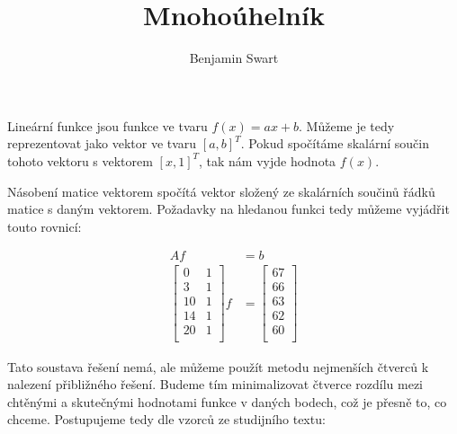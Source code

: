 \documentclass{article}
\title{Mnohoúhelník}
\author{Benjamin Swart}
\begin{document}
Lineární funkce jsou funkce ve tvaru $f(x) = ax + b$. Můžeme je tedy reprezentovat jako vektor ve tvaru $\left[a, b\right]^T$. Pokud spočítáme skalární součin tohoto vektoru s vektorem $\left[x, 1\right]^T$, tak nám vyjde hodnota $f(x)$.

Násobení matice vektorem spočítá vektor složený ze skalárních součinů řádků matice s daným vektorem. Požadavky na hledanou funkci tedy můžeme vyjádřit touto rovnicí:

\begin{align*}
    A f & = b \\
    \begin{bmatrix}
        0  & 1 \\
        3  & 1 \\
        10 & 1 \\
        14 & 1 \\
        20 & 1 \\
    \end{bmatrix} f
        & =
    \begin{bmatrix}
        67 \\
        66 \\
        63 \\
        62 \\
        60 \\
    \end{bmatrix}
\end{align*}

Tato soustava řešení nemá, ale můžeme použít metodu nejmenších čtverců k nalezení přibližného řešení. Budeme tím minimalizovat čtverce rozdílu mezi chtěnými a skutečnými hodnotami funkce v daných bodech, což je přesně to, co chceme. Postupujeme tedy dle vzorců ze studijního textu:
\end{document}
